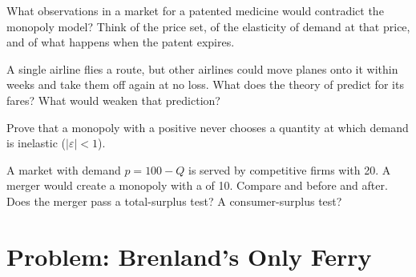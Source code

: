 \begin{exercise}[$\star\star\star$]\label{exo:g11:monopoly:12}
What observations in a market for a patented medicine would contradict the monopoly model? Think of the price set, of the elasticity of demand at that price, and of what
happens when the patent expires.
\end{exercise}

\begin{exercise}[$\star\star\star$]\label{exo:g11:monopoly:13}
A single airline flies a route, but other airlines could move planes onto it within weeks and take them off again at no loss. What does the theory of 
predict for its fares? What would weaken that prediction?
\end{exercise}

\begin{exercise}[$\star\star\star$]\label{exo:g11:monopoly:14}
Prove that a monopoly with a positive  never chooses a quantity at which demand is inelastic ($|\varepsilon| < 1$).
\end{exercise}

\begin{exercise}[$\star\star\star$]\label{exo:g11:monopoly:15}
A market with demand $p = 100 - Q$ is served by competitive firms with  20. A merger would create a monopoly with a  of 10. Compare 
and  before and after. Does the merger pass a total-surplus test? A consumer-surplus test?
\end{exercise}

\section{Problem: Brenland's Only Ferry}

